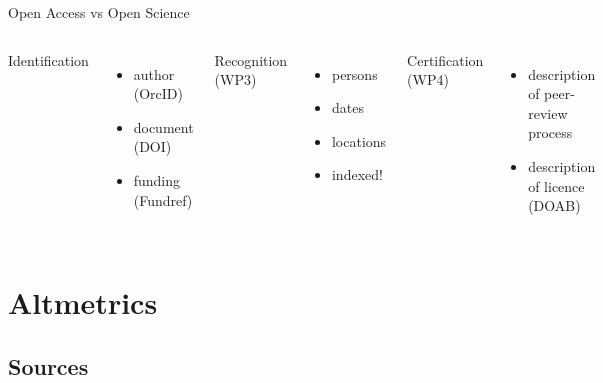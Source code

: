 \documentclass[xcolor=svgnames]{beamer}
\begin{document}
        \begin{frame}{Open Access vs Open Science}
            \vspace{0.05\textheight}
            \begin{columns}[c]
                    Identification 
                    \begin{itemize}
                        \item<2-> author (OrcID)
                        \item<3-> document (DOI)
                        \item<4-> funding (Fundref)
                    \end{itemize}
                    Recognition (WP3)
                    \begin{itemize}
                        \item<5-> persons
                        \item<6-> dates
                        \item<7-> locations
                        \item<8-> indexed!
                    \end{itemize}
                    Certification (WP4)
                    \begin{itemize}
                        \item<9-> description of peer-review process
                        \item<10-> description of licence (DOAB)
                    \end{itemize}
            \end{columns}
        \end{frame}

\section{Altmetrics}

    \subsection{Sources}
\end{document}
